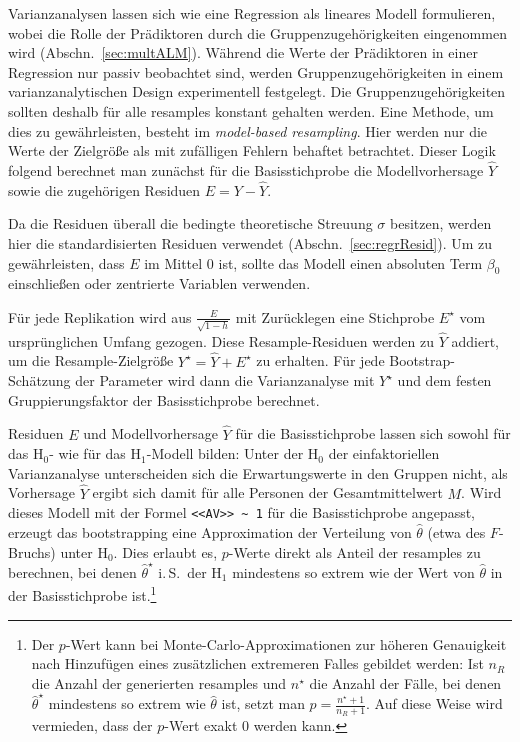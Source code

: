 
Varianzanalysen lassen sich wie eine Regression als lineares Modell formulieren, wobei die Rolle der Prädiktoren durch die Gruppenzugehörigkeiten eingenommen wird (Abschn.\ \ref{sec:multALM}). Während die Werte der Prädiktoren in einer Regression nur passiv beobachtet sind, werden Gruppenzugehörigkeiten in einem varianzanalytischen Design experimentell festgelegt. Die Gruppenzugehörigkeiten sollten deshalb für alle resamples konstant gehalten werden. Eine Methode, um dies zu gewährleisten, besteht im \emph{model-based resampling}. Hier werden nur die Werte der Zielgröße als mit zufälligen Fehlern behaftet betrachtet. Dieser Logik folgend berechnet man zunächst für die Basisstichprobe die Modellvorhersage $\hat{Y}$ sowie die zugehörigen Residuen $E = Y - \hat{Y}$.

Da die Residuen überall die bedingte theoretische Streuung $\sigma$ besitzen, werden hier die standardisierten Residuen verwendet (Abschn.\ \ref{sec:regrResid}). Um zu gewährleisten, dass $E$ im Mittel $0$ ist, sollte das Modell einen absoluten Term $\beta_{0}$ einschließen oder zentrierte Variablen verwenden.

Für jede Replikation wird aus $\frac{E}{\sqrt{1-h}}$ mit Zurücklegen eine Stichprobe $E^{\star}$ vom ursprünglichen Umfang gezogen. Diese Resample-Residuen werden zu $\hat{Y}$ addiert, um die Resample-Zielgröße $Y^{\star} = \hat{Y} + E^{\star}$ zu erhalten. Für jede Bootstrap-Schätzung der Parameter wird dann die Varianzanalyse mit $Y^{\star}$ und dem festen Gruppierungsfaktor der Basisstichprobe berechnet.

Residuen $E$ und Modellvorhersage $\hat{Y}$ für die Basisstichprobe lassen sich sowohl für das $\text{H}_{0}$- wie für das $\text{H}_{1}$-Modell bilden: Unter der $\text{H}_{0}$ der einfaktoriellen Varianzanalyse unterscheiden sich die Erwartungswerte in den Gruppen nicht, als Vorhersage $\hat{Y}$ ergibt sich damit für alle Personen der Gesamtmittelwert $M$. Wird dieses Modell mit der Formel \lstinline!<<AV>> ~ 1! für die Basisstichprobe angepasst, erzeugt das bootstrapping eine Approximation der Verteilung von $\hat{\theta}$ (etwa des $F$-Bruchs) unter $\text{H}_{0}$. Dies erlaubt es, $p$-Werte direkt als Anteil der resamples zu berechnen, bei denen $\hat{\theta}^{\star}$ i.\,S.\ der $\text{H}_{1}$ mindestens so extrem wie der Wert von $\hat{\theta}$ in der Basisstichprobe ist.\footnote{\label{ftn:bootP}Der $p$-Wert kann bei Monte-Carlo-Approximationen zur höheren Genauigkeit nach Hinzufügen eines zusätzlichen extremeren Falles gebildet werden: Ist $n_{R}$ die Anzahl der generierten resamples und $n^{\star}$ die Anzahl der Fälle, bei denen $\hat{\theta}^{\star}$ mindestens so extrem wie $\hat{\theta}$ ist, setzt man $p = \frac{n^{\star} + 1}{n_{R} + 1}$. Auf diese Weise wird vermieden, dass der $p$-Wert exakt $0$ werden kann.}

